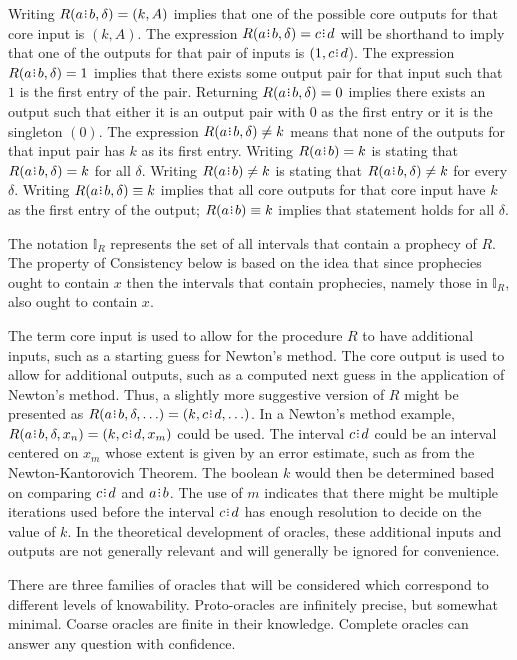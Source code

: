 \documentclass[12pt]{article}
\begin{document}
Writing $R(a\rint b, \delta)=(k ,A)$ implies that one of the possible core outputs for that core input is $(k, A)$. The expression $R(a\rint b, \delta) = c\rint d$ will be shorthand to imply that one of the outputs for that pair of inputs is $(1, c\rint d$).  The expression $R(a \rint b, \delta) = 1$ implies that there exists some output pair for that input such that $1$ is the first entry of the pair. Returning $R(a\rint b, \delta) = 0$ implies there exists an output such that either it is an output pair with $0$ as the first entry or it is the singleton $(0)$. The expression $R(a\rint b, \delta) \neq k$ means that none of the outputs for that input pair has $k$ as its first entry. Writing $R(a \rint b) = k$ is stating that $R(a \rint b, \delta) = k$ for all $\delta$.  Writing $R(a \rint b) \neq k$ is stating that  $R(a\rint b, \delta) \neq k$ for every $\delta$. Writing $R(a \rint b, \delta) \equiv k$ implies that all core outputs for that core input have $k$ as the first entry of the output; $R(a \rint b) \equiv k$ implies that statement holds for all $\delta$.

The notation $\mathbb{I}_R$ represents the set of all intervals that contain a prophecy of $R$. The property of Consistency below is based on the idea that since prophecies ought to contain $x$ then the intervals that contain prophecies, namely those in $\mathbb{I}_R$,  also ought to contain $x$. 

The term core input is used to allow for the procedure $R$ to have additional inputs, such as a starting guess for Newton's method. The core output is used to allow for additional outputs, such as a computed next guess in the application of Newton's method. Thus, a slightly more suggestive version of $R$ might be presented as $R(a \rint b, \delta, \ldots) = (k, c \rint d, \ldots)$. In a Newton's method example, $R(a \rint b, \delta, x_n) = (k, c \rint d, x_m)$ could be used. The interval $c \rint d$ could be an interval centered on $x_m$ whose extent is given by an error estimate, such as from the Newton-Kantorovich Theorem. The boolean $k$ would then be determined based on comparing $c \rint d$ and $a \rint b$. The use of $m$ indicates that there might be multiple iterations used before the interval $c \rint d$ has enough resolution to decide on the value of $k$. In the theoretical development of oracles, these additional inputs and outputs are not generally relevant and will generally be ignored for convenience.  

There are three families of oracles that will be considered which correspond to different levels of knowability. Proto-oracles are infinitely precise, but somewhat minimal. Coarse oracles are finite in their knowledge. Complete oracles can answer any question with confidence. 
\end{document}
